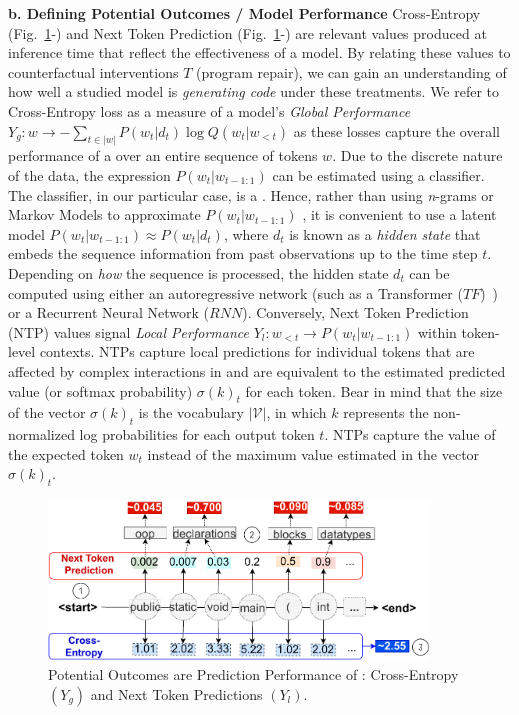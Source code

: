 \textbf{b. Defining Potential Outcomes / Model Performance} Cross-Entropy ({Fig.~\ref{fig:performance}-}) and Next Token Prediction ({Fig.~\ref{fig:performance}-}) are relevant values produced at inference time that reflect the effectiveness of a model. By relating these values to counterfactual interventions $T$ (\ie program repair), we can gain an understanding of how well a studied model is \textit{generating code} under these treatments. We refer to Cross-Entropy loss as a measure of a model's \textit{Global Performance} $Y_g: w \to - \sum_{t \in |w|} P(w_t | d_t) \log Q(w_t | w_{<t})$ as these losses capture the overall performance of a \nlm over an entire sequence of tokens $w$. Due to the discrete nature of the data, the expression $P(w_t | w_{t-1:1} )$ can be estimated using a classifier. The classifier, in our particular case, is a \nlm \citep{Bengio2003AModel}. Hence, rather than using \textit{n}-grams or Markov Models to approximate $P(w_t | w_{t-1:1})$ \citep{Karampatsis2020Open-VocabularyAbstract}, it is convenient to use a latent model $P(w_t | w_{t-1:1} ) \approx P(w_t | d_t )$, where $d_t$ is known as a \textit{hidden state} that embeds the sequence information from past observations up to the time step $t$. Depending on \textit{how} the sequence is processed, the hidden state $d_t$ can be computed using either an autoregressive network (\ie such as a Transformer ($TF$)~\citep{vaswani2017transformers}) or a Recurrent Neural Network ($RNN$). Conversely, Next Token Prediction (NTP) values signal \textit{Local Performance} $Y_l:w_{<t} \to P(w_t | w_{t-1:1})$ within token-level contexts. NTPs capture local predictions for individual tokens that are affected by complex interactions in \nlms and are equivalent to the estimated predicted value (or softmax probability) $\sigma(k)_t$ for each token. Bear in mind that the size of the vector $\sigma(k)_t$ is the vocabulary $|\mathcal{V}|$, in which $k$ represents the non-normalized log probabilities for each output token $t$. NTPs capture the value of the expected token $w_t$ instead of the maximum value estimated in the vector $\sigma(k)_t$.

\begin{figure}[h]
		\centering
		\includegraphics[width=0.9\textwidth]{graphics/preliminaries/fig_2_performance.pdf}
		\caption{Potential Outcomes are Prediction Performance of  \nlms: Cross-Entropy $(Y_g)$ and Next Token Predictions $(Y_l)$.}
        \label{fig:performance}
\end{figure}

